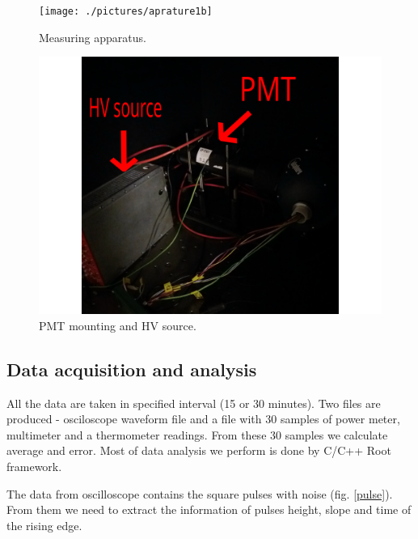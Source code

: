 \begin{figure}[H]
 \centering
 \texttt{[image: ./pictures/aprature1b]}
 \caption{Measuring apparatus.}
 \label{aparature1}
\end{figure}

\begin{figure}[H]
 \centering
 \includegraphics[scale = 0.09]{./pictures/aparature2b}
 \caption{PMT mounting and HV source.}
 \label{aparature2}
\end{figure}


\subsection{Data acquisition and analysis}
All the data are taken in specified interval (15 or 30 minutes). Two files are produced - osciloscope waveform file and a file with 30 samples of power meter, multimeter and a thermometer readings. From these 30 samples we calculate average and error. Most of data analysis we perform is done by C/C++ Root framework.
\par
The data from oscilloscope contains the square pulses with noise (fig. \ref{pulse}). From them we need to extract the information of pulses height, slope and time of the rising edge.

